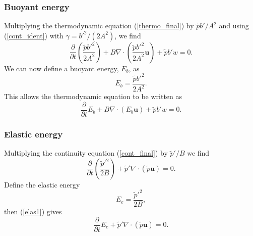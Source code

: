 \documentclass[times]{qjrms4}
\begin{document}
\subsubsection{Buoyant energy}

Multiplying the thermodynamic equation (\ref{thermo_final}) by $ \tilde{p} b' / A^2 $ 
and using (\ref{cont_ident}) with $\gamma = b'^2 / (2A^2) $, we find
\begin{equation}
\frac{\partial}{\partial t} \left( \frac { \tilde{p} b'^2}{2A^2}\right) + 
B \nabla \cdot \left( \frac {\tilde{p} b'^2}{2A^2} \mathbf u\right) + \tilde{p} b' w =0.
\end{equation} 
We can now define a buoyant energy, $E_b$, as 
\begin{equation}\label{buoyant_energy}
E_b =  \frac {\tilde{p} b'^2}{2A^2}.
\end{equation} 
This allows the thermodynamic equation to be written as
\begin{equation}\label{buoyant_energy2}
\frac{\partial}{\partial t} E_b + B \nabla \cdot (E_b \mathbf u) +\tilde{p} b' w =0.
\end{equation}

\subsubsection{Elastic energy}

Multiplying the continuity equation (\ref{cont_final}) by ${\tilde{p}'}/{B}$ we find
\begin{equation} \label{elas1}
\frac {\partial }{\partial t}\left( \frac{\tilde{p}'^2}{2B} \right) 
+ \tilde{p}'  \nabla \cdot (\tilde{p} \mathbf u) = 0.
\end{equation}
Define the elastic energy 
\begin{equation}
E_e = \frac {\tilde{p}'^2 }{2B},
\end{equation}
then  (\ref{elas1}) gives
\begin{equation} \label{elastic_energy}
\frac {\partial}{\partial t} E_e + \tilde{p}' \nabla \cdot ( \tilde{p} \mathbf u) = 0.
\end{equation} 
\end{document}
